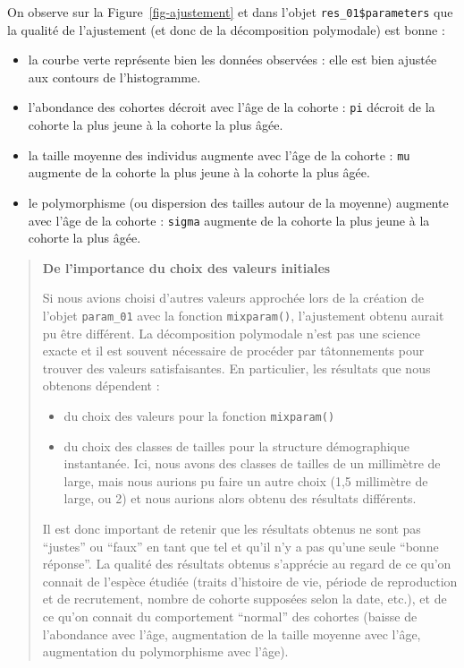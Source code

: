 \documentclass[
  french,
  a4paper,
  DIV=11,
  numbers=noendperiod,
  oneside]{scrreprt}
\providecommand{\tightlist}{%
  \setlength{\itemsep}{0pt}\setlength{\parskip}{0pt}}
\begin{document}
\begin{tcolorbox}
{\begin{figure}[H]
{}

\end{figure}%

}

On observe sur la Figure~\ref{fig-ajustement} et dans l'objet
\texttt{res\_01\$parameters} que la qualité de l'ajustement (et donc de
la décomposition polymodale) est bonne :

\begin{itemize}
\tightlist
\item
  la courbe verte représente bien les données observées : elle est bien
  ajustée aux contours de l'histogramme.
\item
  l'abondance des cohortes décroit avec l'âge de la cohorte :
  \texttt{pi} décroit de la cohorte la plus jeune à la cohorte la plus
  âgée.
\item
  la taille moyenne des individus augmente avec l'âge de la cohorte :
  \texttt{mu} augmente de la cohorte la plus jeune à la cohorte la plus
  âgée.
\item
  le polymorphisme (ou dispersion des tailles autour de la moyenne)
  augmente avec l'âge de la cohorte : \texttt{sigma} augmente de la
  cohorte la plus jeune à la cohorte la plus âgée.
\end{itemize}

\begin{quote}
\textbf{De l'importance du choix des valeurs initiales}

Si nous avions choisi d'autres valeurs approchée lors de la création de
l'objet \texttt{param\_01} avec la fonction \texttt{mixparam()},
l'ajustement obtenu aurait pu être différent. La décomposition
polymodale n'est pas une science exacte et il est souvent nécessaire de
procéder par tâtonnements pour trouver des valeurs satisfaisantes. En
particulier, les résultats que nous obtenons dépendent :

\begin{itemize}
\tightlist
\item
  du choix des valeurs pour la fonction \texttt{mixparam()}
\item
  du choix des classes de tailles pour la structure démographique
  instantanée. Ici, nous avons des classes de tailles de un millimètre
  de large, mais nous aurions pu faire un autre choix (1,5 millimètre de
  large, ou 2) et nous aurions alors obtenu des résultats différents.
\end{itemize}

Il est donc important de retenir que les résultats obtenus ne sont pas
``justes'' ou ``faux'' en tant que tel et qu'il n'y a pas qu'une seule
``bonne réponse''. La qualité des résultats obtenus s'apprécie au regard
de ce qu'on connait de l'espèce étudiée (traits d'histoire de vie,
période de reproduction et de recrutement, nombre de cohorte supposées
selon la date, etc.), et de ce qu'on connait du comportement ``normal''
des cohortes (baisse de l'abondance avec l'âge, augmentation de la
taille moyenne avec l'âge, augmentation du polymorphisme avec l'âge).
\end{quote}


\end{tcolorbox}
\end{document}
